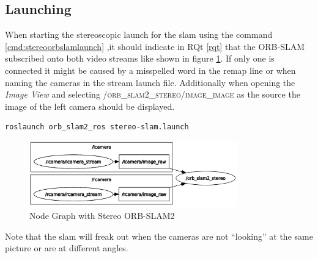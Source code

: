 \subsection{Launching}
When starting the stereoscopic launch for the \gls{slam} using the command \ref{cmd:stereoorbslamlaunch} ,it should indicate in RQt \ref{rqt} that the ORB-SLAM subscribed onto both video streams like shown in figure \ref{img:nodegraphstereoslam}. If only one is connected it might be caused by a misspelled word in the remap line or when naming the cameras in the stream launch file. Additionally when opening the \textit{Image View} and selecting \textsc{/orb\_slam2\_stereo/image\_image} as the source the image of the left camera should be displayed.\newline
\begin{lstlisting}[language=bash, label={cmd:stereoorbslamlaunch}]
    roslaunch orb_slam2_ros stereo-slam.launch
\end{lstlisting}
\begin{figure}[h]
	\centering
	\includegraphics[width=0.8\textwidth]{./media/images/nodegraphstereoorbslam.png}
  	\caption{Node Graph with Stereo ORB-SLAM2}
  	\label{img:nodegraphstereoslam}
\end{figure}
Note that the \gls{slam} will freak out when the cameras are not \enquote{looking} at the same picture or are at different angles.

